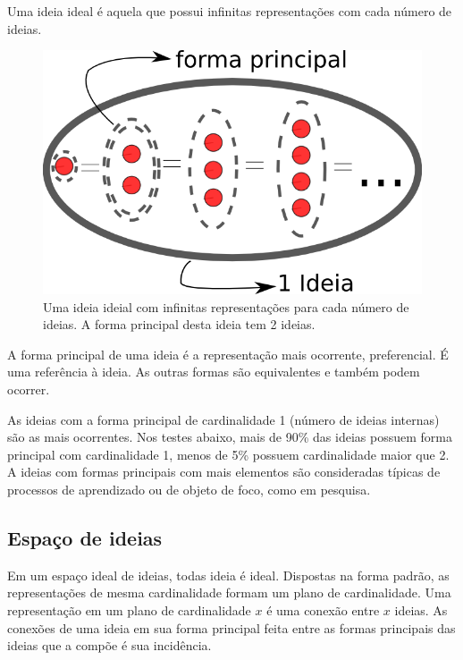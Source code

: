 \documentclass[a4paper,12pt,titlepage]{article}
\begin{document}
Uma ideia ideal é aquela que possui infinitas representações
com cada número de ideias.

\begin{figure}[h!]
    \begin{center}
        \includegraphics[scale=.3]{figs/ideia2.png}
        \caption{Uma ideia ideial com infinitas representações para cada número de ideias. A forma
        principal desta ideia tem 2 ideias.}
        \label{fig:face}
    \end{center}
\end{figure}


A forma principal de uma ideia é a representação mais ocorrente, preferencial.
É uma referência à ideia. As outras formas são equivalentes e também podem ocorrer.

As ideias com a forma principal de cardinalidade 1 (número de ideias internas)
são as mais ocorrentes. Nos testes
abaixo, mais de 90\% das ideias possuem forma principal com cardinalidade 1,
menos de 5\% possuem cardinalidade maior que 2.
A ideias com formas principais com mais elementos são consideradas
típicas de processos de aprendizado ou de objeto de foco, como em pesquisa.

\subsection{Espaço de ideias}
Em um espaço ideal de ideias, todas ideia é ideal. Dispostas
na forma padrão, as representações de mesma cardinalidade
formam um plano de cardinalidade. Uma representação em um plano
de cardinalidade $x$ é uma conexão entre $x$ ideias. As conexões
de uma ideia em sua forma principal feita entre as formas principais das ideias que a compõe é sua
incidência.
\end{document}
